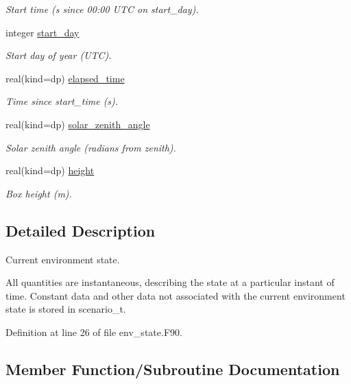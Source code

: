 \begin{DoxyCompactItemize}
\begin{DoxyCompactList}\small\item\em Start time (s since 00\+:00 U\+TC on {\ttfamily start\+\_\+day}). \end{DoxyCompactList}\item 
integer \mbox{\hyperlink{structpmc__env__state_1_1env__state__t_a014af9d840b16306c0a328feccdc7d56}{start\+\_\+day}}
\begin{DoxyCompactList}\small\item\em Start day of year (U\+TC). \end{DoxyCompactList}\item 
real(kind=dp) \mbox{\hyperlink{structpmc__env__state_1_1env__state__t_a82191988fb9ecb4eac2b25c9844516bb}{elapsed\+\_\+time}}
\begin{DoxyCompactList}\small\item\em Time since {\ttfamily start\+\_\+time} (s). \end{DoxyCompactList}\item 
real(kind=dp) \mbox{\hyperlink{structpmc__env__state_1_1env__state__t_a46aa5f60559e6c4d36a9968ba74a2410}{solar\+\_\+zenith\+\_\+angle}}
\begin{DoxyCompactList}\small\item\em Solar zenith angle (radians from zenith). \end{DoxyCompactList}\item 
real(kind=dp) \mbox{\hyperlink{structpmc__env__state_1_1env__state__t_a308a21d9e3ff987e492363079d39e6a4}{height}}
\begin{DoxyCompactList}\small\item\em Box height (m). \end{DoxyCompactList}\end{DoxyCompactItemize}


\subsection{Detailed Description}
Current environment state. 

All quantities are instantaneous, describing the state at a particular instant of time. Constant data and other data not associated with the current environment state is stored in scenario\+\_\+t. 

Definition at line 26 of file env\+\_\+state.\+F90.



\subsection{Member Function/\+Subroutine Documentation}
\mbox{\label{structpmc__env__state_1_1env__state__t_a94f7db1f715b391a610346f2e1b024e2}} 
